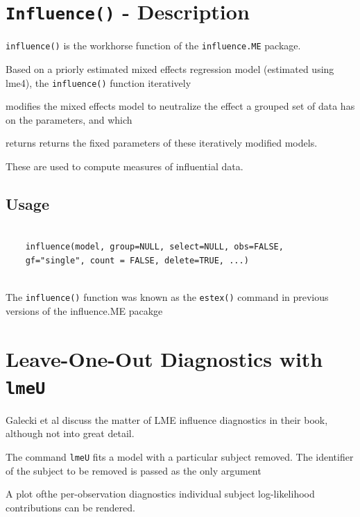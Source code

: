 \documentclass[12pt, a4paper]{report}
\theoremstyle{plain}
\theoremstyle{definition}
\theoremstyle{remark}
\begin{document}
\section{\texttt{Influence()} - Description}
\texttt{influence()} is the workhorse function of the \texttt{influence.ME} package. 


Based on a priorly estimated mixed effects regression model (estimated using lme4), the \texttt{influence()} function iteratively 

modifies the mixed effects model to neutralize the effect a grouped set of data has on the parameters, and which 

returns returns the fixed parameters of these iteratively modified models. 

These are used to compute measures of influential data.




\subsection*{Usage}
\begin{framed}
	\begin{verbatim}
	
	influence(model, group=NULL, select=NULL, obs=FALSE, 
	gf="single", count = FALSE, delete=TRUE, ...)
	
	\end{verbatim}
\end{framed}
The \texttt{influence()} function was known as the \texttt{estex()} command in previous versions of the influence.ME pacakge









\section{Leave-One-Out Diagnostics with \texttt{lmeU}}
Galecki et al discuss the matter of LME influence diagnostics in their book, although not into great detail.


The command \texttt{lmeU} fits a model with a particular subject removed. The identifier of the subject to be removed is passed as the only argument

A plot ofthe per-observation diagnostics individual subject log-likelihood contributions can be rendered.
\end{document}
